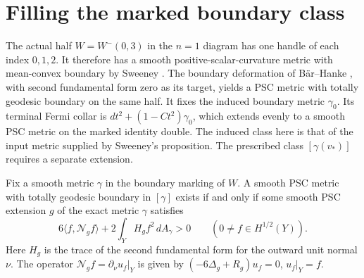 \section{Filling the marked boundary class}
\label{sec:marked-boundary-class}

The actual half \(W=W^-(0,3)\) in the \(n=1\) diagram has one
handle of each index \(0,1,2\). It therefore has a smooth
positive-scalar-curvature metric with mean-convex boundary by
Sweeney \cite[Proposition 1.2]{Sweeney2026Contractible}.
The boundary deformation of
B\"ar--Hanke \cite[Definition 3.1 and Theorem 3.7]{BaerHanke2023Boundary},
with second fundamental form zero as its target, yields a PSC
metric with totally geodesic boundary on the same half. It fixes
the induced boundary metric \(\gamma_0\). Its terminal Fermi
collar is \(dt^2+(1-Ct^2)\gamma_0\), which extends evenly to a
smooth PSC metric on the marked identity double. The induced
class here is that of the input metric supplied by Sweeney's
proposition. The prescribed class \([\gamma(v_*)]\) requires a
separate extension.

\begin{proposition}
\label{prop:marked-robin-trace}
Fix a smooth metric \(\gamma\) in the boundary marking of \(W\).
A smooth PSC metric with totally geodesic boundary in \([\gamma]\)
exists if and only if some smooth PSC extension \(g\) of the
exact metric \(\gamma\) satisfies
\[
 6\langle f,\mathcal N_g f\rangle
       +2\int_Y H_g f^2\,dA_\gamma>0
 \qquad (0\ne f\in H^{1/2}(Y)).
\]
Here \(H_g\) is the trace of the second fundamental form for
the outward unit normal \(\nu\). The operator
\(\mathcal N_g f=\partial_\nu u_f|_Y\) is given by
\((-6\Delta_g+R_g)u_f=0\), \(u_f|_Y=f\).
\end{proposition}


